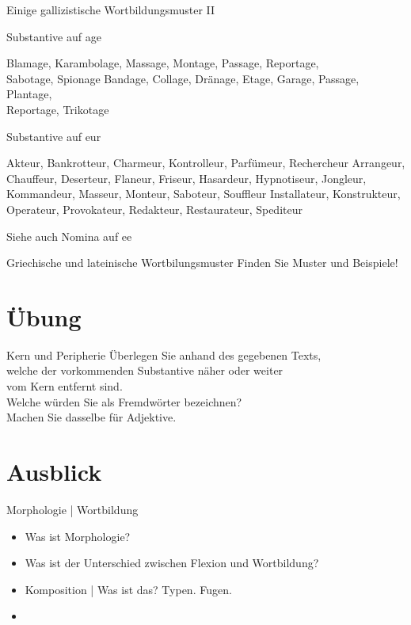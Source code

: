 \begin{frame}
  {Einige gallizistische Wortbildungsmuster II}
  \onslide<+->
  \onslide<+->
  \begin{exe}
    \ex \alert{Substantive auf age}
    \begin{xlist}
      \ex \small Blamage, Karambolage, Massage, Montage, Passage, Reportage,\\
      Sabotage, Spionage
      \ex \small Bandage, Collage, Dränage, Etage, Garage, Passage, Plantage,\\
      Reportage, Trikotage
    \end{xlist}
    \onslide<+->
    \ex \alert{Substantive auf eur}
    \begin{xlist}
      \ex \small Akteur, Bankrotteur, Charmeur, Kontrolleur, Parfümeur, Rechercheur
      \ex \small Arrangeur, Chauffeur, Deserteur, Flaneur, Friseur, Hasardeur, Hypnotiseur, Jongleur, Kommandeur, Masseur, Monteur, Saboteur, Souffleur
      \ex \small Installateur, Konstrukteur, Operateur, Provokateur, Redakteur, Restaurateur, Spediteur
    \end{xlist}
  \end{exe}
  \onslide<+->
  \Viertelzeile
  Siehe auch Nomina auf \alert{ee}
\end{frame}

\begin{frame}
  {Griechische und lateinische Wortbilungsmuster}
  \onslide<+->
  \onslide<+->
  \Zeile
  Finden Sie Muster und Beispiele!
\end{frame}

\section{Übung}

\begin{frame}
  {Kern und Peripherie}
  \onslide<+->
  \onslide<+->
  \centering 
  Überlegen Sie anhand des gegebenen Texts,\\
  welche der vorkommenden Substantive näher oder weiter\\
  vom Kern entfernt sind.\\
  \Viertelzeile
  Welche würden Sie als \alert{Fremdwörter} bezeichnen?\\
  \Halbzeile
  Machen Sie dasselbe für Adjektive.
\end{frame}

\section{Ausblick}

\begin{frame}
  {Morphologie | Wortbildung}
  \onslide<+->
  \onslide<+->
  \begin{itemize}[<+->]
    \item Was ist Morphologie?
    \item Was ist der Unterschied zwischen Flexion und Wortbildung?
    \item Komposition | Was ist das? Typen. Fugen.
      \Zeile
    \item \citet[Kapitel 7 und Abschnitt 8.1]{Schaefer2018b}
  \end{itemize}

\end{frame}
